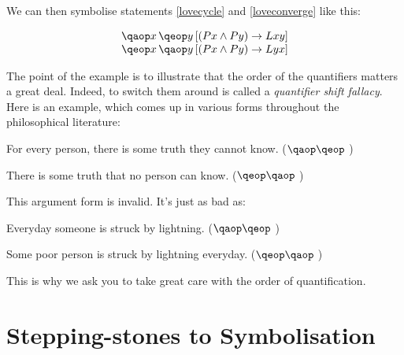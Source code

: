 \documentclass[PHIL101-Textbook.tex]{subfiles}
\begin{document}
\noindent We can then symbolise statements \ref{lovecycle} and \ref{loveconverge} like this:

\[
  \begin{array}{l}
\qa{x}{\qeb{y}{(\atom P x \eand \atom Py) \eif \atom L  xy }}\\
\qe{x}{\qab{y}{(\atom P x \eand \atom Py) \eif \atom L yx}}
  \end{array}
  \]


The point of the example is to illustrate that the order of the quantifiers matters a great deal. Indeed, to switch them around is called a \emph{quantifier shift fallacy}. Here is an example, which comes up in various forms throughout the philosophical literature:
	\begin{earg}
		\item[] For every person, there is some truth they cannot know. \hfill ($\qa \qe$)
		\item[\therefore] There is some truth that no person can know. \hfill ($\qe \qa$)
	\end{earg}
        This argument form is invalid.
        It's just as bad as:
	\begin{earg}
		\item[] Everyday someone is struck by lightning. \hfill ($\qa \qe$)
		\item[\therefore] Some poor person is struck by lightning everyday. \hfill ($\qe \qa$)
	\end{earg}


\noindent This is why we ask you to take great care with the order of quantification.




\section{Stepping-stones to Symbolisation}
\end{document}
